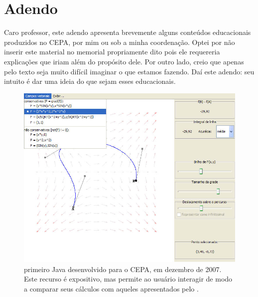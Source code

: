 \section{Adendo}
\label{sec:adendo}

	Caro professor, este adendo apresenta brevemente alguns conteúdos educacionais produzidos no CEPA, por mim ou sob a minha coordenação. Optei por não inserir este material no memorial propriamente dito pois ele requereria explicações que iriam além do propósito dele. Por outro lado, creio que apenas pelo texto seja muito difícil imaginar o que estamos fazendo. Daí este adendo: seu intuito é dar uma ideia do que sejam esses  educacionais.
	
	\begin{figure}
		\centering
		\begin{minipage}[b]{0.46\textwidth}
			\includegraphics[width=\textwidth]{images/campo-vetorial.jpg}
			\caption{\footnotesize primeiro  Java desenvolvido para o CEPA, em dezembro de 2007. Este recurso é expositivo, mas permite ao usuário interagir de modo a comparar seus cálculos com aqueles apresentados pelo .}
			\label{fig:campo}
		\end{minipage}\hfill
		\begin{minipage}[b]{0.46\textwidth}

\end{minipage}
\end{figure}
